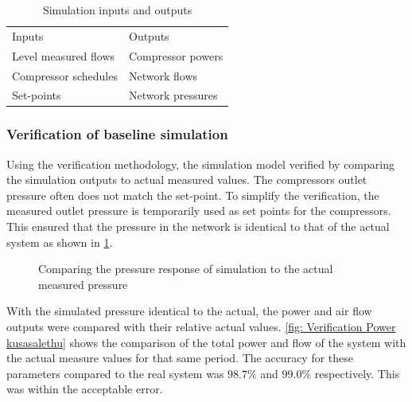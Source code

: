 \begin{table}[h]
	\centering
	\begin{tabular}{ll}
		\hline 
		Inputs \hspace*{4cm}    & Outputs \hspace*{4cm}    \\  \hhline{==}
		Level measured flows & Compressor powers \\
		Compressor schedules & Network flows \\
		Set-points & Network pressures \\
		\hline
	\end{tabular}
		\caption{Simulation inputs and outputs}
\label{table: Mine B inputs/outputs}
\end{table}
	
	\subsubsection{Verification of baseline simulation}
	Using the verification methodology, the simulation model verified by comparing the simulation outputs to actual measured values. The compressors outlet pressure often does not match the set-point. To simplify the verification, the measured outlet pressure is temporarily used as set points for the compressors. This ensured that the pressure in the network is identical to that of the actual system as shown in \cref{fig: Verification Pressure kusasalethu}.
	\par 
	\begin{figure}[h]
		\centering
		
		\caption{Comparing the pressure response of simulation to the actual measured pressure}
		\label{fig: Verification Pressure kusasalethu}
	\end{figure}

 	With the simulated pressure identical to the actual, the power and air flow outputs were compared with their relative actual values. \cref{fig: Verification Power kusasalethu} shows the comparison of the total power and flow of the system with the actual measure values for that same period. The accuracy for these parameters compared to the real system was $98.7 \%$ and $99.0 \%$ respectively. This was within the acceptable error. 
 
